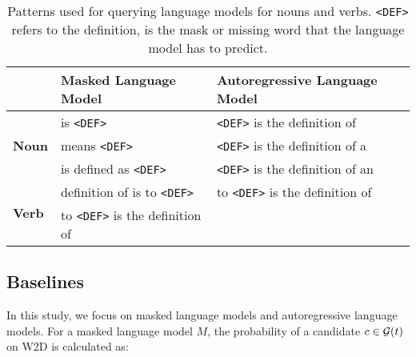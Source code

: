 \documentclass[11pt,a4paper]{article}
\begin{document}

\begin{table*}
\centering
\begin{tabular}{lll}
\hline
& \textbf{Masked Language Model} & \textbf{Autoregressive Language Model}\\ \hline
\multirow{3}{*}{\textbf{Noun}} & \underline{\hspace{3mm}} is \texttt{<DEF>} & \texttt{<DEF>} is the definition of \underline{\hspace{3mm}} \\
 & \underline{\hspace{3mm}} means \texttt{<DEF>} & \texttt{<DEF>} is the definition of a \underline{\hspace{3mm}} \\
 & \underline{\hspace{3mm}} is defined as \texttt{<DEF>} & \texttt{<DEF>} is the definition of an \underline{\hspace{3mm}}\\ \hline
 \multirow{2}{*}{\textbf{Verb}} & definition of \underline{\hspace{3mm}} is to \texttt{<DEF>} & to \texttt{<DEF>} is the definition of \underline{\hspace{3mm}} \\
 & to \texttt{<DEF>} is the definition of \underline{\hspace{3mm}} & \\ \hline
 
\end{tabular}
\caption{Patterns used for querying language models for
  nouns and verbs.
\texttt{<DEF>} refers to the definition,
\underline{\hspace{3mm}} is the mask or missing word that
the language model has to predict.}
\label{tab:patterns}
\end{table*}

\subsection{Baselines}

  
In this study, we focus on masked language models and
autoregressive language models. For a masked language model
$M$, the probability of a candidate $c \in {\cal G}(t)$ on W2D  is calculated as:
\end{document}

